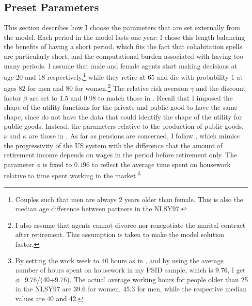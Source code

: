 \documentclass[12pt]{article}
\begin{document}
 \subsection{Preset Parameters}
 This section describes how I choose the parameters that are set externally from the model.  Each period in the model lasts one year: I chose this length balancing the benefits of having a short period, which fits the fact that cohabitation spells are particularly short, and the computational burden associated with having too many periods. I assume that male and female agents start making decisions at age $20$ and $18$ respectively,\footnote{Couples such that men are always 2 years older than female. This is also the median age difference between partners in the NLSY97.} while they retire at 65 and die with probability $1$ at ages $82$ for men and $80$ for women.\footnote{I also assume that agents cannot divorce nor renegotiate the marital contract after retirement. This assumption is taken to make the model solution faster.} The relative risk aversion $\gamma$ and the discount factor $\beta$ are set to 1.5 and 0.98 to match those in \cite{attanasio2008}. Recall that I imposed the shape of the utility functions for the private and public good to have the same shape, since do not have the data that could identify the shape of the utility for public goods. Instead, the parameters relative to the production of public goods, $\nu$ and $\kappa$ are those in \cite{mcgrattan1997}. As far as pensions are concerned, I follow \cite{heathcote2010}, which mimics the progressivity of the US system with the difference that the amount of retirement income depends on wages in the period before retirement only. The parameter $\phi$ is fixed to $0.196$ to reflect the average time spent on housework relative to time spent working in the market.\footnote{By setting the work week to 40 hours as in \cite{greenwood2016}, and by using the average number of hours spent on housework in my PSID sample, which is 9.76, I get $\phi$=9.76/(40+9.76). The actual average working hours for people older than 25 in the NLSY97 are 39.6 for women, 45.3 for men, while the respective median values are 40 and 42.}
 
\end{document}
